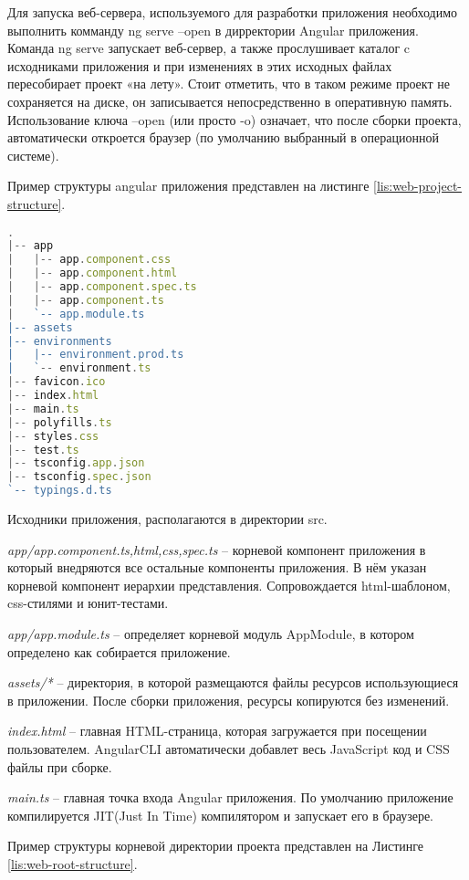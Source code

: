 Для запуска веб-сервера, используемого для разработки приложения необходимо выполнить комманду ng serve –open в дирректории Angular приложения.
Команда ng serve запускает веб-сервер, а также прослушивает каталог c исходниками приложения и при изменениях в этих исходных файлах пересобирает проект «на лету».
Стоит отметить, что в таком режиме проект не сохраняется на диске, он записывается непосредственно в оперативную память.
Использование ключа --open (или просто -o) означает, что после сборки проекта, автоматически откроется браузер (по умолчанию выбранный в операционной системе).

Пример структуры angular приложения представлен на листинге \ref{lis:web-project-structure}.

\begin{lstlisting}[language=TypeScript, captionpos=b,
label={lis:web-project-structure},
caption={Пример структуры angular приложения}]
.
|-- app
|   |-- app.component.css
|   |-- app.component.html
|   |-- app.component.spec.ts
|   |-- app.component.ts
|   `-- app.module.ts
|-- assets
|-- environments
|   |-- environment.prod.ts
|   `-- environment.ts
|-- favicon.ico
|-- index.html
|-- main.ts
|-- polyfills.ts
|-- styles.css
|-- test.ts
|-- tsconfig.app.json
|-- tsconfig.spec.json
`-- typings.d.ts
\end{lstlisting}

Исходники приложения, располагаются в директории src.

\textit{app/app.component.{ts,html,css,spec.ts}} – корневой компонент приложения в который внедряются все остальные компоненты приложения. В нём указан корневой компонент иерархии представления. 
Сопровождается html-шаблоном, css-стилями и юнит-тестами.

\textit{app/app.module.ts} – определяет корневой модуль AppModule, в котором определено как собирается приложение.

\textit{assets/*} – директория, в которой размещаются файлы ресурсов использующиеся в приложении. После сборки приложения, ресурсы копируются без изменений.

\textit{index.html} – главная HTML-страница, которая загружается при посещении пользователем. AngularCLI автоматически добавлет весь JavaScript код и CSS файлы при сборке.

\textit{main.ts} – главная точка входа Angular приложения. По умолчанию приложение компилируется JIT(Just In Time) компилятором и запускает его в браузере.

Пример структуры корневой директории проекта представлен на Листинге \ref{lis:web-root-structure}.

